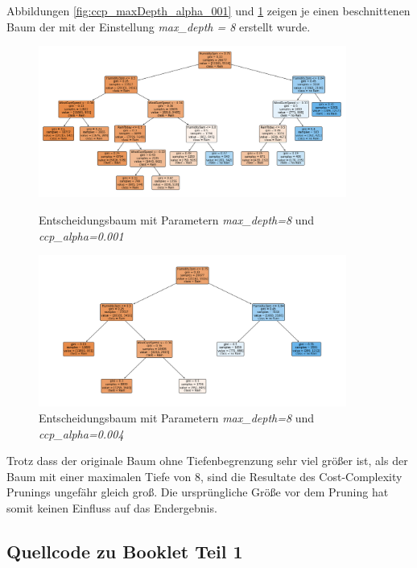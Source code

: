 Abbildungen \ref{fig:ccp_maxDepth_alpha_001} und \ref{fig:ccp_maxDepth_alpha_004} zeigen je einen beschnittenen Baum der mit der Einstellung \emph{max\_depth = 8} erstellt wurde.\\
\begin{figure}[H]
	\centering
	\begin{minipage}{0.45\textwidth}
		\centering
		\includegraphics[width=0.9\textwidth]{Bilder/ccp_maxDepth_alpha_001.png}
		\caption{Entscheidungsbaum mit Parametern \emph{max\_depth=8} und \emph{ccp\_alpha=0.001}}
		\label{fig:ccp_maxDepth_alpha_001}
	\end{minipage}\hfill
	\begin{minipage}{0.45\textwidth}
		\centering
		\includegraphics[width=0.9\textwidth]{Bilder/ccp_maxdepth_alpha_004.png}
		\caption{Entscheidungsbaum mit Parametern \emph{max\_depth=8} und \emph{ccp\_alpha=0.004}}
		\label{fig:ccp_maxDepth_alpha_004}
	\end{minipage}\hfill
\end{figure}
\noindent \hspace*{7mm}
Trotz dass der originale Baum ohne Tiefenbegrenzung sehr viel größer ist, als der Baum mit einer maximalen Tiefe von 8, sind die Resultate des Cost-Complexity Prunings ungefähr gleich groß. Die ursprüngliche Größe vor dem Pruning hat somit keinen Einfluss auf das Endergebnis.
\pagebreak
\subsection{Quellcode zu Booklet Teil 1}
\pagebreak
